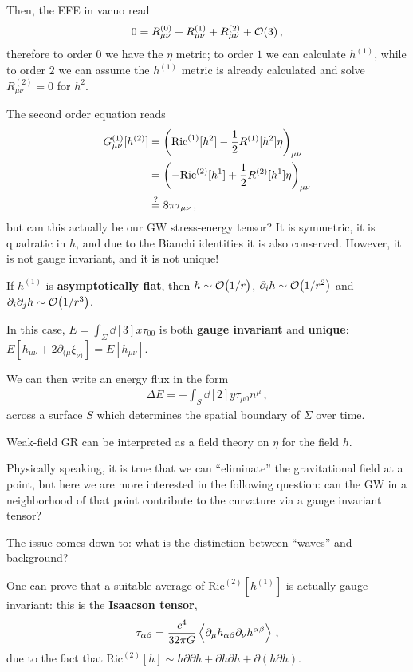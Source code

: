 \documentclass[main.tex]{subfiles}
\begin{document}
Then, the EFE in vacuo read 
%
\begin{align}
0 = 
R^{(0)}_{\mu \nu } + 
R^{(1)}_{\mu \nu } + 
R^{(2)}_{\mu \nu } +  \order{3}
\,,
\end{align}
%
therefore to order 0 we have the \(\eta \) metric; to order \(1\) we can calculate \(h^{(1)}\), while to order \(2\) we can assume the \(h^{(1)}\) metric is already calculated and solve \(R^{(2)}_{\mu \nu } = 0\) for \(h^{2}\). 

The second order equation reads 
%
\begin{align}
G^{(1)}_{\mu \nu }[h^{(2)}] &= \qty(\text{Ric}^{(1)}[h^{2}] - \frac{1}{2} R^{(1)} [h^{2}]\eta )_{\mu \nu }  \\
&=\qty(- \text{Ric}^{(2)} [h^{1}] + \frac{1}{2} R^{(2)}[h^{1}] \eta )_{\mu \nu }   \\
&\overset{?}{=} 8 \pi \tau_{\mu \nu }
\,,
\end{align}
%
but can this actually be our GW stress-energy tensor? It is symmetric, it is quadratic in \(h\), and due to the Bianchi identities it is also conserved. 
However, it is not gauge invariant, and it is not unique! 

If \(h^{(1)}\) is \textbf{asymptotically flat}, then \(h \sim \order{1/r}\), \(\partial_{i} h \sim \order{1/r^2}\) and \(\partial_{i} \partial_{j} h \sim \order{1/r^3}\).

In this case, \(E = \int_{\Sigma } \dd[3]{x} \tau_{00} \) is both \textbf{gauge invariant} and \textbf{unique}: \(E[h_{\mu \nu } + 2 \partial_{(\mu } \xi_{\nu )}] = E[h_{\mu \nu }]\). 

We can then write an energy flux in the form 
%
\begin{align}
\Delta E = -\int_{S} \dd[2]{y} \tau_{\mu 0} n^\mu   
\,,
\end{align}
%
across a surface \(S\) which determines the spatial boundary of \(\Sigma \) over time.  

Weak-field GR can be interpreted as a field theory on \(\eta \) for the field \(h\). 

Physically speaking, it is true that we can ``eliminate'' the gravitational field at a point, but here we are more interested in the following question:
can the GW in a neighborhood of that point contribute to the curvature via a gauge invariant tensor?  

The issue comes down to: what is the distinction between ``waves'' and background?

One can prove that a suitable average of \(\text{Ric}^{(2)}[h^{(1)}]\) is actually gauge-invariant: this is the \textbf{Isaacson tensor}, 
%
\begin{align}
\tau_{\alpha \beta } = \frac{c^{4}}{32 \pi G} \expval{\partial_{\mu } h_{\alpha \beta } \partial_{\nu } h^{\alpha \beta }}
\,,
\end{align}
%
due to the fact that \(\text{Ric}^{(2)}[h] \sim h \partial \partial h + \partial h \partial h + \partial (h \partial h)\). 
\end{document}
